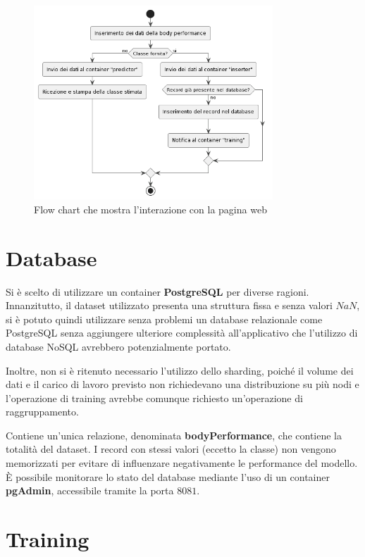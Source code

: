 \documentclass[12pt,a4paper]{report}
\begin{document}
\begin{figure}[H]
  \includegraphics[width=0.8\textwidth]{webserver}
  \centering
  \caption{Flow chart che mostra l'interazione con la pagina web}
\end{figure}


\section{Database}

Si è scelto di utilizzare un container \textbf{PostgreSQL} per diverse ragioni.
Innanzitutto, il dataset utilizzato presenta una struttura fissa
e senza valori $NaN$, si è potuto quindi utilizzare senza problemi
un database relazionale come PostgreSQL senza aggiungere
ulteriore complessità all'applicativo che l'utilizzo di database
NoSQL avrebbero potenzialmente portato.

Inoltre, non si è ritenuto necessario l'utilizzo dello sharding,
poiché il volume dei dati e il carico di lavoro previsto non richiedevano
una distribuzione su più nodi e l'operazione di training avrebbe
comunque richiesto un'operazione di raggruppamento.

Contiene un'unica relazione, denominata \textbf{bodyPerformance},
che contiene la totalità del dataset.
I record con stessi valori (eccetto la classe)
non vengono memorizzati per evitare di influenzare negativamente
le performance del modello.
È possibile monitorare lo stato del database mediante l'uso di
un container \textbf{pgAdmin}, accessibile tramite la porta $8081$.

\section{Training}
\end{document}
